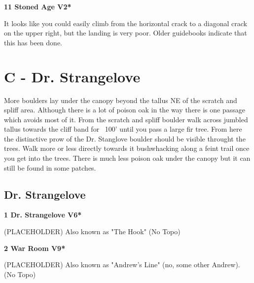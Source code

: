 \begin{multicols}{2}
\needspace{1.5cm}
\label{rt:Stoned Age}
\colorbox{green!20}{
\parbox{0.95\linewidth}{
\textbf{
11 Stoned Age V2*  
}}}
\begin{adjustwidth}{0.5cm}{}			
It looks like you could easily climb from the horizontal crack to a diagonal crack on the upper right, but the landing is very poor. Older guidebooks indicate that this has been done.
\end{adjustwidth}





\newpage

\section{C - Dr. Strangelove}\label{sa:Dr. Strangelove}
More boulders lay under the canopy beyond the tallus NE of the scratch and spliff area. Although there is a lot of poison oak in the way there is one passage which avoids most of it. From the scratch and spliff boulder walk across jumbled tallus towards the cliff band for ~100' until you pass a large fir tree. From here the distinctive prow of the Dr. Stanglove boulder should be visible throught the trees. Walk more or less directly towards it bushwhacking along a feint trail once you get into the trees. There is much less poison oak under the canopy but it can still be found in some patches.\\




\needspace{1.5cm}
\subsection*{Dr. Strangelove}\label{bf:Dr. Strangelove}
	


\needspace{1.5cm}
\label{rt:Dr. Strangelove}
\colorbox{RoyalBlue!20}{
\parbox{0.95\linewidth}{
\textbf{
1 Dr. Strangelove V6*  
}}}
\begin{adjustwidth}{0.5cm}{}			
(PLACEHOLDER) Also known as "The Hook"
  (No Topo)
\end{adjustwidth}




\needspace{1.5cm}
\label{rt:War Room}
\colorbox{Goldenrod!50}{
\parbox{0.95\linewidth}{
\textbf{
2 War Room V9*  
}}}
\begin{adjustwidth}{0.5cm}{}			
(PLACEHOLDER) Also known as "Andrew's Line" (no, some other Andrew).
  (No Topo)
\end{adjustwidth}






\end{multicols}
